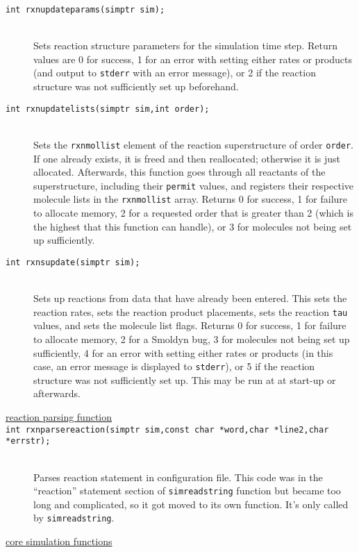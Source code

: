 \documentclass {book}
\begin{document}
\begin{description}
\item[\texttt{int rxnupdateparams(simptr sim);}]
\hfill \\
Sets reaction structure parameters for the simulation time step. Return values are 0 for success, 1 for an error with setting either rates or products (and output to \texttt{stderr} with an error message), or 2 if the reaction structure was not sufficiently set up beforehand.

\item[\texttt{int rxnupdatelists(simptr sim,int order);}]
\hfill \\
Sets the \texttt{rxnmollist} element of the reaction superstructure of order \texttt{order}. If one already exists, it is freed and then reallocated; otherwise it is just allocated. Afterwards, this function goes through all reactants of the superstructure, including their \texttt{permit} values, and registers their respective molecule lists in the \texttt{rxnmollist} array. Returns 0 for success, 1 for failure to allocate memory, 2 for a requested order that is greater than 2 (which is the highest that this function can handle), or 3 for molecules not being set up sufficiently.

\item[\texttt{int rxnsupdate(simptr sim);}]
\hfill \\
Sets up reactions from data that have already been entered. This sets the reaction rates, sets the reaction product placements, sets the reaction \texttt{tau} values, and sets the molecule list flags. Returns 0 for success, 1 for failure to allocate memory, 2 for a Smoldyn bug, 3 for molecules not being set up sufficiently, 4 for an error with setting either rates or products (in this case, an error message is displayed to \texttt{stderr}), or 5 if the reaction structure was not sufficiently set up. This may be run at at start-up or afterwards.

\item[\underline{reaction parsing function}]

\item[\texttt{int rxnparsereaction(simptr sim,const char *word,char *line2,char *errstr);}]
\hfill \\
Parses reaction statement in configuration file. This code was in the ``reaction'' statement section of \texttt{simreadstring} function but became too long and complicated, so it got moved to its own function. It's only called by \texttt{simreadstring}.

\item[\underline{core simulation functions}]


\end{description}
\end{document}
